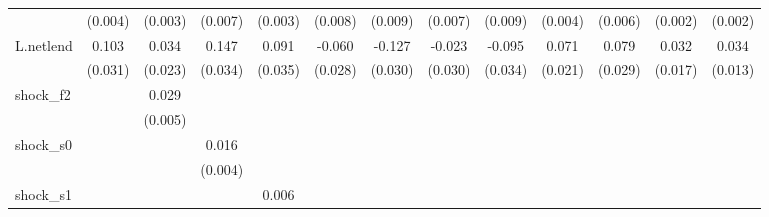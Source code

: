 {\begin{tabular}{l*{12}{c}}
            &     (0.004)         &     (0.003)         &     (0.007)         &     (0.003)         &     (0.008)         &     (0.009)         &     (0.007)         &     (0.009)         &     (0.004)         &     (0.006)         &     (0.002)         &     (0.002)         \\
\addlinespace
L.netlend   &       0.103\sym{***}&       0.034         &       0.147\sym{***}&       0.091\sym{**} &      -0.060\sym{**} &      -0.127\sym{***}&      -0.023         &      -0.095\sym{***}&       0.071\sym{***}&       0.079\sym{**} &       0.032\sym{*}  &       0.034\sym{**} \\
            &     (0.031)         &     (0.023)         &     (0.034)         &     (0.035)         &     (0.028)         &     (0.030)         &     (0.030)         &     (0.034)         &     (0.021)         &     (0.029)         &     (0.017)         &     (0.013)         \\
\addlinespace
shock\_f2    &                     &       0.029\sym{***}&                     &                     &                     &                     &                     &                     &                     &                     &                     &                     \\
            &                     &     (0.005)         &                     &                     &                     &                     &                     &                     &                     &                     &                     &                     \\
\addlinespace
shock\_s0    &                     &                     &       0.016\sym{***}&                     &                     &                     &                     &                     &                     &                     &                     &                     \\
            &                     &                     &     (0.004)         &                     &                     &                     &                     &                     &                     &                     &                     &                     \\
\addlinespace
shock\_s1    &                     &                     &                     &       0.006\sym{**} &                     &                     &                     &                     &                     &                     &                     &                     \\

\end{tabular}}
